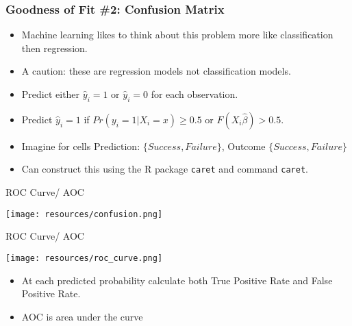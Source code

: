 \documentclass[aspectratio=169]{beamer}
\begin{document}
\begin{frame}
\frametitle{Goodness of Fit \#2: Confusion Matrix }
\begin{itemize} 
\item Machine learning likes to think about this problem more like \alert{classification} then regression.
\item A caution: these are \alert{regression} models not \alert{classification} models.
\item Predict either $\hat{y}_i = 1$ or $\hat{y}_i = 0$ for each observation.
\item Predict $\hat{y}_i =1$ if $Pr(y_i = 1 | X_i =x) \geq0.5$ or $F(X_i \hat{\beta}) > 0.5$.
\item Imagine for cells Prediction: $\{Success, Failure\}$, Outcome $\{Success, Failure\}$
\item Can construct this using the R package \texttt{caret} and command \texttt{caret}.
\end{itemize}
\end{frame}


\begin{frame}{ROC Curve/ AOC}
\begin{center}
\texttt{[image: resources/confusion.png]}\\
\end{center}
\end{frame}



\begin{frame}{ROC Curve/ AOC}
\begin{center}
\texttt{[image: resources/roc\_curve.png]}\\
\end{center}
\begin{itemize}
\item At each predicted probability calculate both \alert{True Positive Rate} and \alert{False Positive Rate}.
\item AOC is area under the curve
\end{itemize}
\end{frame}


\end{document}
